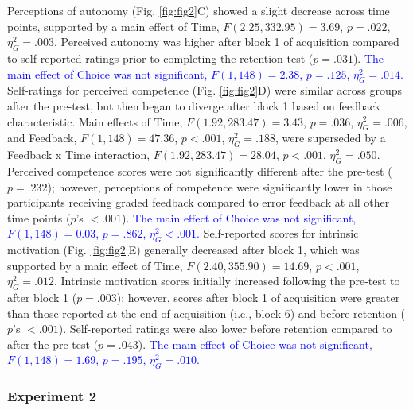 \documentclass[
  man, donotrepeattitle,floatsintext]{apa7}
\begin{document}
Perceptions of autonomy (Fig. \ref{fig:fig2}C) showed a slight decrease across time points, supported by a main effect of Time, \(F(2.25,332.95) = 3.69\), \(p = .022\), \(\eta_{G}^2 = .003\). Perceived autonomy was higher after block 1 of acquisition compared to self-reported ratings prior to completing the retention test (\(p = .031\)). \textcolor{blue}{The main effect of Choice was not significant, $F(1,148) = 2.38$, $p = .125$, $\eta_{G}^2 = .014$.} Self-ratings for perceived competence (Fig. \ref{fig:fig2}D) were similar across groups after the pre-test, but then began to diverge after block 1 based on feedback characteristic. Main effects of Time, \(F(1.92, 283.47) = 3.43\), \(p = .036\), \(\eta_{G}^2 = .006\), and Feedback, \(F(1,148) = 47.36\), \(p < .001\), \(\eta_{G}^2 = .188\), were superseded by a Feedback x Time interaction, \(F(1.92, 283.47) = 28.04\), \(p < .001\), \(\eta_{G}^2 = .050\). Perceived competence scores were not significantly different after the pre-test (\(p = .232\)); however, perceptions of competence were significantly lower in those participants receiving graded feedback compared to error feedback at all other time points (\(p\)'s \(< .001\)). \textcolor{blue}{The main effect of Choice was not significant, $F(1,148) = 0.03$, $p = .862$, $\eta_{G}^2 < .001$.} Self-reported scores for intrinsic motivation (Fig. \ref{fig:fig2}E) generally decreased after block 1, which was supported by a main effect of Time, \(F(2.40,355.90) = 14.69\), \(p < .001\), \(\eta_{G}^2 = .012\). Intrinsic motivation scores initially increased following the pre-test to after block 1 (\(p = .003\)); however, scores after block 1 of acquisition were greater than those reported at the end of acquisition (i.e., block 6) and before retention (\(p\)'s \(< .001\)). Self-reported ratings were also lower before retention compared to after the pre-test (\(p = .043\)). \textcolor{blue}{The main effect of Choice was not significant, $F(1,148) = 1.69$, $p = .195$, $\eta_{G}^2 = .010$.}

\hypertarget{experiment-2-4}{%
\subsubsection{Experiment 2}\label{experiment-2-4}}
\end{document}
